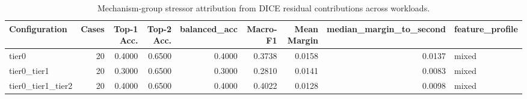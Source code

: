 \begin{table}[t]
\centering
\caption{Mechanism-group stressor attribution from DICE residual contributions across workloads.}
\label{tab:dice_stressor_diagnosis}
\footnotesize
\begin{tabular}{lrrrrrrrl}
\toprule
Configuration & Cases & Top-1 Acc. & Top-2 Acc. & balanced_acc & Macro-F1 & Mean Margin & median_margin_to_second & feature_profile \\
\midrule
tier0 & 20 & 0.4000 & 0.6500 & 0.4000 & 0.3738 & 0.0158 & 0.0137 & mixed \\
tier0_tier1 & 20 & 0.3000 & 0.6500 & 0.3000 & 0.2810 & 0.0141 & 0.0083 & mixed \\
tier0_tier1_tier2 & 20 & 0.4000 & 0.6500 & 0.4000 & 0.4022 & 0.0128 & 0.0098 & mixed \\
\bottomrule
\end{tabular}

\end{table}
